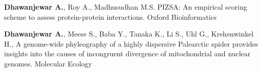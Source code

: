 


\begin{cvpubs}

  \pubentry
    {\textbf{Dhawanjewar A.}, Roy A., Madhusudhan M.S.}
	{PIZSA: An empirical scoring scheme to assess protein-protein interactions.}
	{Oxford Bioinformatics}

  \pubentry
  	{\textbf{Dhawanjewar A.}, Meese S., Baba Y., Tanaka K., Li S., Uhl G., Krehenwinkel H.,}
  	{A genome-wide phyleography of a highly dispersive Palearctic spider provides insights into the causes of incongruent divergence of mitochondrial and nuclear genomes.}
  	{Molecular Ecology}

\end{cvpubs}
